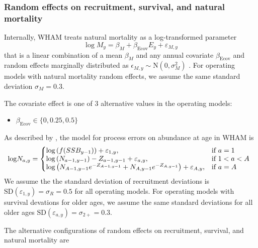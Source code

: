 \documentclass[
  12pt,
]{article}
\begin{document}
\hypertarget{random-effects-on-recruitment-survival-and-natural-mortality}{%
\subsubsection*{Random effects on recruitment, survival, and natural
mortality}\label{random-effects-on-recruitment-survival-and-natural-mortality}}

Internally, WHAM treats natural mortality as a log-transformed parameter
\[
\log M_y = \beta_M + \beta_{\text{Ecov}} E_y + \varepsilon_{M,y}
\] that is a linear combination of a mean \(\beta_M\) and any annual
covariate \(\beta_{\text{Ecov}}\) and random effects marginally
distributed as \(\epsilon_{M,y} \sim \text{N}\left(0,\sigma_M^2\right)\)
\citep{stockmiller21}. For operating models with natural mortality
random effects, we assume the same standard deviation
\(\sigma_M = 0.3\).

The covariate effect is one of 3 alternative values in the operating
models:

\begin{itemize}
\item $\beta_\text{Ecov} \in \{0,0.25,0.5\}$
\end{itemize}

As described by \citet{stockmiller21}, the model for process errors on
abundance at age in WHAM is \begin{equation}
  \text{log}N_{a,y}=\left\{
    \begin{array}{@{}lll@{}}
      \text{log} \left( f(SSB_{y-1}) \right) + \varepsilon_{1,y}, & \text{if}\ a = 1 \\
      \text{log} \left( N_{a-1,y-1} \right) - Z_{a-1,y-1} + \varepsilon_{a,y}, & \text{if}\ 1 < a < A \\
      \text{log} \left( N_{A-1,y-1} e^{-Z_{A-1,y-1}} + N_{A,y-1} e^{-Z_{A,y-1}} \right) + \varepsilon_{A,y}, & \text{if}\ a = A
    \end{array}\right.
\end{equation} We assume the the standard deviation of recruitment
deviations is
\(\text{SD}\left(\varepsilon_{1,y}\right) = \sigma_R = 0.5\) for all
operating models. For operating models with survival devations for older
ages, we assume the same standard deviations for all older ages
\(\text{SD}\left(\varepsilon_{a,y}\right) = \sigma_{2+} = 0.3\).

The alternative configurations of random effects on recruitment,
survival, and natural mortality are
\end{document}
